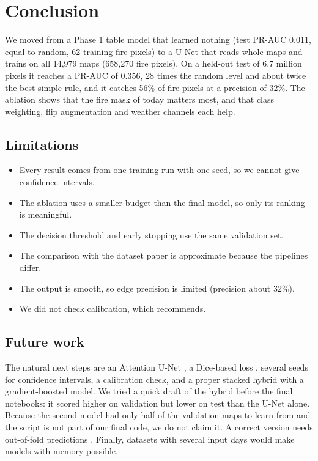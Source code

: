 \section{Conclusion}
We moved from a Phase 1 table model that learned nothing (test PR-AUC 0.011, equal to random, 62 training fire pixels) to a U-Net that reads whole maps and trains on all 14{,}979 maps (658{,}270 fire pixels). On a held-out test of 6.7 million pixels it reaches a PR-AUC of 0.356, 28 times the random level and about twice the best simple rule, and it catches 56\% of fire pixels at a precision of 32\%. The ablation shows that the fire mask of today matters most, and that class weighting, flip augmentation and weather channels each help.

\subsection{Limitations}
\begin{itemize}
\item Every result comes from one training run with one seed, so we cannot give confidence intervals.
\item The ablation uses a smaller budget than the final model, so only its ranking is meaningful.
\item The decision threshold and early stopping use the same validation set.
\item The comparison with the dataset paper is approximate because the pipelines differ.
\item The output is smooth, so edge precision is limited (precision about 32\%).
\item We did not check calibration, which \cite{kumar2025stochastic} recommends.
\end{itemize}

\subsection{Future work}
The natural next steps are an Attention U-Net \cite{oktay2018attention}, a Dice-based loss \cite{milletari2016vnet}, several seeds for confidence intervals, a calibration check, and a proper stacked hybrid with a gradient-boosted model. We tried a quick draft of the hybrid before the final notebooks: it scored higher on validation but lower on test than the U-Net alone. Because the second model had only half of the validation maps to learn from and the script is not part of our final code, we do not claim it. A correct version needs out-of-fold predictions \cite{wolpert1992stacked}. Finally, datasets with several input days \cite{gerard2023wildfirespreadts} would make models with memory possible.
